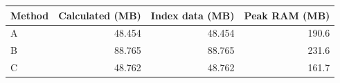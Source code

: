 \begin{tabular}{lrrr}
\toprule
Method & Calculated (MB) & Index data (MB) & Peak RAM (MB) \\
\midrule
A & 48.454 & 48.454 & 190.6 \\
B & 88.765 & 88.765 & 231.6 \\
C & 48.762 & 48.762 & 161.7 \\
\bottomrule
\end{tabular}
